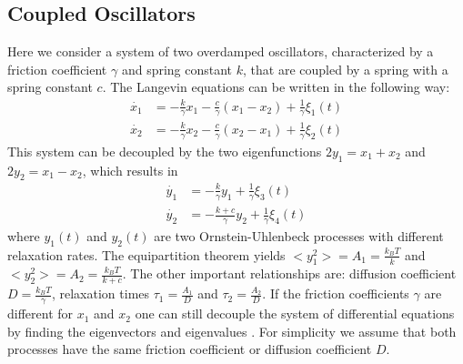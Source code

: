 \documentclass[%
 reprint,
 amsmath,amssymb,
 aps,
]{revtex4-1}
\begin{document}
\subsection{Coupled Oscillators}\label{sec_CO}
Here we consider a system of two overdamped oscillators, characterized by a friction coefficient $\gamma$ and spring constant $k$, that are coupled by a spring with a spring constant $c$.  The Langevin equations can be written in the following way:
\begin{equation}
	\begin{aligned}
		\dot{x_1} &= -\frac{k}{\gamma}x_{1}-\frac{c}{\gamma}(x_{1}-x_{2}) +\frac{1}{\gamma}\xi_{1}(t)\\
		\dot{x_2} &= -\frac{k}{\gamma}x_{2}-\frac{c}{\gamma}(x_{2}-x_{1}) +\frac{1}{\gamma}\xi_{2}(t)
	\end{aligned}
\end{equation}
This system can be decoupled by the two eigenfunctions $2y_{1}=x_{1}+x_{2}$ and $2y_{2}=x_{1}-x_{2}$, which results in
\begin{equation}\label{eq_decoupled}
	\begin{aligned}
		\dot{y_1} &= -\frac{k}{\gamma}y_{1} +\frac{1}{\gamma}\xi_{3}(t)\\
		\dot{y_2} &= -\frac{k+c}{\gamma}y_{2} +\frac{1}{\gamma}\xi_{4}(t)
	\end{aligned}
\end{equation}
where $y_{1}(t)$ and $y_{2}(t)$ are two Ornstein-Uhlenbeck processes with different relaxation rates.  The equipartition theorem yields $<y_{1}^{2}> = A_{1} = \frac{k_{B}T}{k}$ and $<y_{2}^{2}> = A_{2} = \frac{k_{B}T}{k+c}$.  The other important relationships are: diffusion coefficient $D=\frac{k_{B}T}{\gamma}$, relaxation times $\tau_{1}=\frac{A_{1}}{D}$ and $\tau_{2}=\frac{A_{2}}{D}$. If the friction coefficients $\gamma$ are different for $x_{1}$ and $x_{2}$ one can still decouple the system of differential equations by finding the eigenvectors and eigenvalues \cite{RN95}.  For simplicity we assume that both processes have the same friction coefficient or diffusion coefficient $D$.
\end{document}
